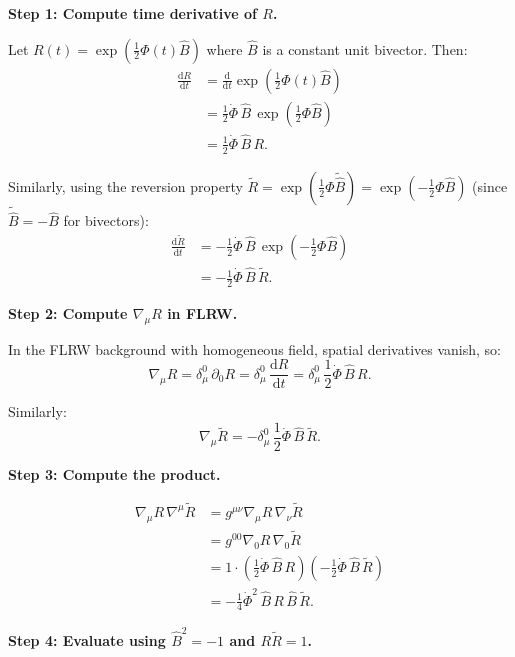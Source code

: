 \documentclass[11pt,a4paper]{article}
\numberwithin{equation}{section}
\theoremstyle{plain}
\theoremstyle{definition}
\theoremstyle{remark}
\newcommand{\dd}{\mathrm{d}}
\begin{document}
\textbf{Step 1: Compute time derivative of $R$.}

Let $R(t) = \exp(\frac{1}{2}\Phi(t)\hat{B})$ where $\hat{B}$ is a constant unit bivector. Then:
\begin{align}
\frac{\dd R}{\dd t} &= \frac{\dd}{\dd t}\exp\left(\frac{1}{2}\Phi(t)\hat{B}\right)\\
&= \frac{1}{2}\dot{\Phi}\,\hat{B}\,\exp\left(\frac{1}{2}\Phi\hat{B}\right)\\
&= \frac{1}{2}\dot{\Phi}\,\hat{B}\,R.
\end{align}

Similarly, using the reversion property $\widetilde{R} = \exp(\frac{1}{2}\Phi\widetilde{\hat{B}}) = \exp(-\frac{1}{2}\Phi\hat{B})$ (since $\widetilde{\hat{B}} = -\hat{B}$ for bivectors):
\begin{align}
\frac{\dd \widetilde{R}}{\dd t} &= -\frac{1}{2}\dot{\Phi}\,\hat{B}\,\exp\left(-\frac{1}{2}\Phi\hat{B}\right)\\
&= -\frac{1}{2}\dot{\Phi}\,\hat{B}\,\widetilde{R}.
\end{align}

\textbf{Step 2: Compute $\nabla_\mu R$ in FLRW.}

In the FLRW background with homogeneous field, spatial derivatives vanish, so:
\begin{equation}
\nabla_\mu R = \delta_\mu^0\,\partial_0 R = \delta_\mu^0\,\frac{\dd R}{\dd t} = \delta_\mu^0\,\frac{1}{2}\dot{\Phi}\,\hat{B}\,R.
\end{equation}

Similarly:
\begin{equation}
\nabla_\mu \widetilde{R} = -\delta_\mu^0\,\frac{1}{2}\dot{\Phi}\,\hat{B}\,\widetilde{R}.
\end{equation}

\textbf{Step 3: Compute the product.}

\begin{align}
\nabla_\mu R\,\nabla^\mu \widetilde{R} &= g^{\mu\nu}\nabla_\mu R\,\nabla_\nu \widetilde{R}\\
&= g^{00}\nabla_0 R\,\nabla_0 \widetilde{R}\\
&= 1 \cdot \left(\frac{1}{2}\dot{\Phi}\,\hat{B}\,R\right)\left(-\frac{1}{2}\dot{\Phi}\,\hat{B}\,\widetilde{R}\right)\\
&= -\frac{1}{4}\dot{\Phi}^2\,\hat{B}\,R\,\hat{B}\,\widetilde{R}.
\end{align}

\textbf{Step 4: Evaluate using $\hat{B}^2 = -1$ and $R\widetilde{R} = 1$.}
\end{document}
